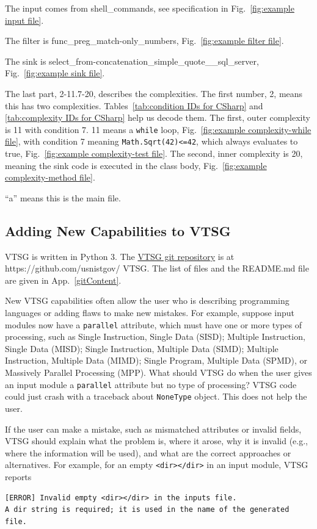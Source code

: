 \noindent The input comes from shell\_commands, see specification in
Fig.~\ref{fig:example input file}.

\noindent The filter is func\_preg\_match-only\_numbers,
Fig.~\ref{fig:example filter file}.

\noindent The sink is select\_from-concatenation\_simple\_quote\_\_sql\_server,
Fig.~\ref{fig:example sink file}.

\noindent The last part, 2-11.7-20, describes the complexities.
The first number, 2, means this has two complexities.
Tables~\ref{tab:condition IDs for CSharp} and
\ref{tab:complexity IDs for CSharp} help us decode them.
The first, outer complexity is 11 with condition 7. 11 means a \verb|while| loop,
Fig.~\ref{fig:example complexity-while file}, 
with condition 7 meaning \verb|Math.Sqrt(42)<=42|, which always evaluates to true,
Fig.~\ref{fig:example complexity-test file}.
The second, inner complexity is 20, meaning the sink code is executed in the class body,
Fig.~\ref{fig:example complexity-method file}.

\noindent ``a'' means this is the main file.

\subsection{Adding New Capabilities to VTSG}
\label{sec:extending VTSG}

VTSG is written in Python 3.
The \href{https://github.com/usnistgov/VTSG}{VTSG git repository} is at
https://github.com/usnistgov/ VTSG.
The list of files and the README.md file are given in App.~\ref{gitContent}.

New VTSG capabilities often allow the user who is describing programming languages or
adding flaws to make new mistakes.  For example, suppose input modules now have
a \verb|parallel|
attribute, which must have one or more types of processing, such as Single
Instruction, Single Data (SISD); Multiple Instruction, Single Data (MISD); Single
Instruction, Multiple Data (SIMD); Multiple Instruction, Multiple Data (MIMD); Single
Program, Multiple Data (SPMD), or Massively Parallel Processing (MPP).  What should
VTSG do when the user gives an input module a \verb|parallel| attribute but no type
of processing?  VTSG code could just crash with a traceback about \verb|NoneType|
object.  This does not help the user.

If the user can make a mistake, such as mismatched attributes or invalid fields, VTSG
should explain what the problem is, where it arose, why it is invalid (e.g., where the
information will be used), and what are the correct approaches or alternatives.  For
example, for an empty \verb|<dir></dir>| in an input module, VTSG reports
\begin{verbatim}
[ERROR] Invalid empty <dir></dir> in the inputs file.
A dir string is required; it is used in the name of the generated file.
\end{verbatim}

